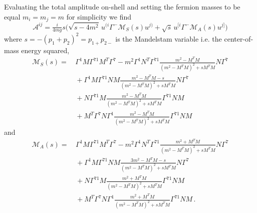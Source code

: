 \documentclass[a4paper,11pt]{article}
\begin{document}
Evaluating the total amplitude on-shell and setting the fermion masses to be equal $m_i=m_j=m$ for simplicity we find
\begin{equation}
\mathcal A^{ij}=
%
%
%
%
\tfrac{i}{4mg}s
\big(
\sqrt{s-4m^2}\,u^{(i}\Gamma^-\mathcal M_S(s)u^{j)}
+\sqrt{s}\,u^{[i}\Gamma^-\mathcal M_A(s)u^{j]}
\big)
%
%
%
%
\end{equation}
where $s=-(p_1+p_2)^2=p_{1+}p_{2-}$ is the Mandelstam variable i.e. the center-of-mass energy squared,
\begin{align}
\mathcal M_S(s)
=\,&
\Gamma^1M\Gamma^{71}M^T\Gamma^7
-m^2\Gamma^1N^T\Gamma^{71}\frac{m^2-M^TM}{(m^2-M^TM)^2+sM^TM}N\Gamma^7
\nonumber\\
&{}
+\Gamma^1M\Gamma^{71}NM\frac{m^2-M^TM-s}{(m^2-M^TM)^2+sM^TM}N\Gamma^7
\nonumber\\
&{}
+N\Gamma^{71}M\frac{m^2-M^TM}{(m^2-M^TM)^2+sM^TM}\Gamma^{71}NM
\nonumber\\
&{}
+M^T\Gamma^7N\Gamma^1\frac{m^2-M^TM}{(m^2-M^TM)^2+sM^TM}\Gamma^{71}NM
\end{align}
and
\begin{align}
\mathcal M_A(s)
=\,&
\Gamma^1M\Gamma^{71}M^T\Gamma^7
-m^2\Gamma^1N^T\Gamma^{71}\frac{m^2+M^TM}{(m^2-M^TM)^2+sM^TM}N\Gamma^7
\nonumber\\
&{}
+\Gamma^1M\Gamma^{71}NM\frac{3m^2-M^TM-s}{(m^2-M^TM)^2+sM^TM}N\Gamma^7
\nonumber\\
&{}
+N\Gamma^{71}M\frac{m^2+M^TM}{(m^2-M^TM)^2+sM^TM}\Gamma^{71}NM
\nonumber\\
&{}
+M^T\Gamma^7N\Gamma^1\frac{m^2+M^TM}{(m^2-M^TM)^2+sM^TM}\Gamma^{71}NM\,.
\end{align}
\end{document}
